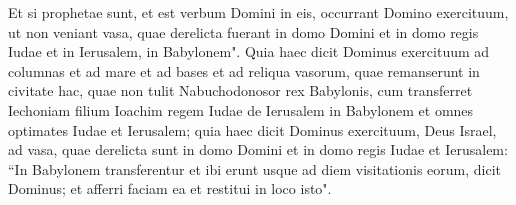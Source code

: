 \begin{biblechapter}
\verse Et si prophetae sunt, et est verbum Domini in eis, occurrant Domino exercituum, ut non veniant vasa, quae derelicta fuerant in domo Domini et in domo regis Iudae et in Ierusalem, in Babylonem". 
\verse Quia haec dicit Dominus exercituum ad columnas et ad mare et ad bases et ad reliqua vasorum, quae remanserunt in civitate hac, 
\verse quae non tulit Nabuchodonosor rex Babylonis, cum transferret Iechoniam filium Ioachim regem Iudae de Ierusalem in Babylonem et omnes optimates Iudae et Ierusalem; 
\verse quia haec dicit Dominus exercituum, Deus Israel, ad vasa, quae derelicta sunt in domo Domini et in domo regis Iudae et Ierusalem: 
\verse “In Babylonem transferentur et ibi erunt usque ad diem visitationis eorum, dicit Dominus; et afferri faciam ea et restitui in loco isto". 
\end{biblechapter}

